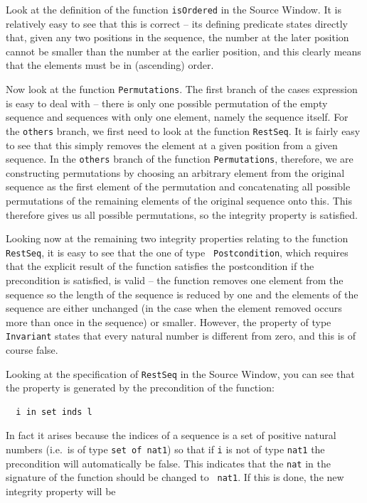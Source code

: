 \documentclass[\pformat,12pt]{article}
\newcommand{\aaa}{\tt }
\newcommand{\guicmd}[1]{{\sf #1}}
\newcommand{\guicmd}[1]{{\gt #1}}
\begin{document}
Look at the definition of the function {\aaa isOrdered} in the
\guicmd{Source Window}. It is relatively easy to see that this is
correct -- its defining predicate states directly that, given any two
positions in the sequence, the number at the later position cannot be
smaller than the number at the earlier position, and this clearly
means that the elements must be in (ascending) order.

Now look at the function {\aaa Permutations}. The first branch of the
cases expression is easy 
to deal with -- there is only one possible permutation of the empty
sequence and sequences with only one element, namely the sequence
itself. For the {\aaa others} branch, we first need to look at the
function {\aaa RestSeq}. It is fairly easy to see that this simply
removes the element at a given position from a given sequence. In the
{\aaa others} branch of the function {\aaa Permutations}, therefore,
we are constructing permutations by choosing an arbitrary element from
the original sequence as the first element of the permutation and
concatenating all possible permutations of the remaining elements of
the original sequence onto this. This therefore gives us all possible
permutations, so the integrity property is satisfied.

Looking now at the remaining two integrity
properties relating to the 
function {\aaa RestSeq}, it is easy to see that the one of type {\aaa
  Postcondition}, which requires that the explicit result of the
function satisfies the postcondition if the precondition is satisfied,
is valid -- the function removes one element from the sequence so the
length of the sequence is reduced by one and the elements of the
sequence are either unchanged (in the case when the element removed
occurs more than once in the sequence) or smaller. However, the
property of type {\aaa Invariant} states that every natural number is
different from zero, and this is of course false.

Looking at the specification of {\aaa RestSeq} in the \guicmd{Source
  Window}, you can see that the property is generated by the
  precondition of the function:

\begin{verbatim}
  i in set inds l
\end{verbatim}

In fact it arises because the indices of a sequence is a set of
positive natural numbers (i.e.\ is of type 
\verb+set of nat1+) so that if {\aaa i} is not of type {\aaa nat1} the 
precondition will automatically be false. This indicates that the
{\aaa nat} in the signature of the function should be changed to {\aaa
  nat1}. If this is done, the new integrity property will be 
\end{document}
